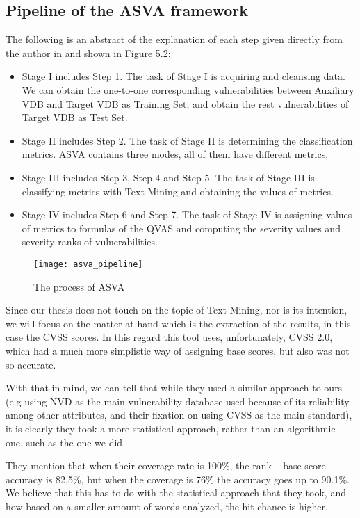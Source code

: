 \subsection{Pipeline of the ASVA framework}

The following is an abstract of the explanation of each step given directly from the author in \parencite{novelty} and shown in Figure 5.2:

\begin{itemize}
	\item Stage I includes Step 1. The task of Stage I is acquiring and cleansing data. We can obtain the one-to-one corresponding vulnerabilities between Auxiliary VDB and Target VDB as Training Set, and obtain the rest vulnerabilities of Target VDB as Test Set.
	\item Stage II includes Step 2. The task of Stage II is determining the classification metrics. ASVA contains three modes, all of them have different metrics.
	\item Stage III includes Step 3, Step 4 and Step 5. The task of Stage III is classifying metrics with Text Mining and obtaining the values of metrics.
	\item Stage IV includes Step 6 and Step 7. The task of Stage IV is assigning values of metrics to formulas of the QVAS and computing the severity values and severity ranks of vulnerabilities.
\end{itemize}

\begin{figure}[!htb]
	\caption{The process of ASVA}
	\centering
	\texttt{[image: asva\_pipeline]}
\end{figure}

Since our thesis does not touch on the topic of Text Mining, nor is its intention, we will focus on the matter at hand which is the extraction of the results, in this case the CVSS scores. In this regard this tool uses, unfortunately, CVSS 2.0, which had a much more simplistic way of assigning base scores, but also was not so accurate. 

With that in mind, we can tell that while they used a similar approach to ours (e.g using NVD as the main vulnerability database used because of its reliability among other attributes, and their fixation on using CVSS as the main standard), it is clearly they took a more statistical approach, rather than an algorithmic one, such as the one we did.

They mention that when their coverage rate is 100\%, the rank -- base score -- accuracy is 82.5\%, but when the coverage is 76\% the accuracy goes up to 90.1\%. We believe that this has to do with the statistical approach that they took, and how based on a smaller amount of words analyzed, the hit chance is higher.

